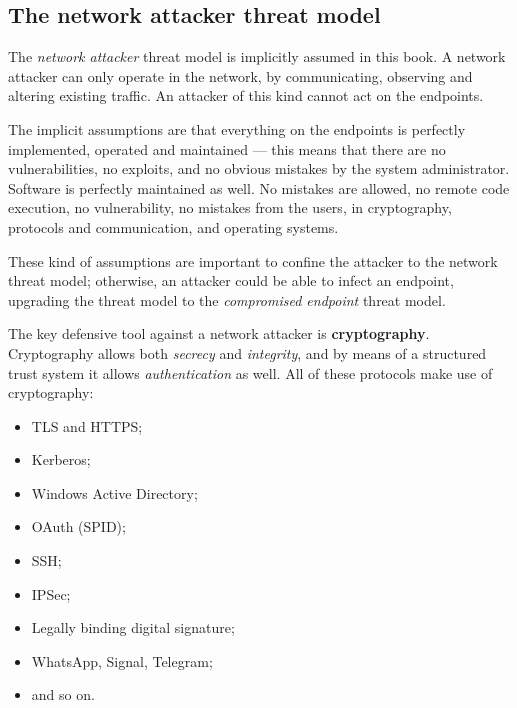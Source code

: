 \documentclass[10pt]{extreport}
\begin{document}
\subsection{The network attacker threat model}

The \emph{network attacker} threat model is implicitly assumed in this book. A
network attacker can only operate in the network, by communicating, observing
and altering existing traffic. An attacker of this kind cannot act on the
endpoints.

The implicit assumptions are that everything on the endpoints is perfectly
implemented, operated and maintained --- this means that there are no
vulnerabilities, no exploits, and no obvious mistakes by the system
administrator. Software is perfectly maintained as well. No mistakes are
allowed, no remote code execution, no vulnerability, no mistakes from the
users, in cryptography, protocols and communication, and operating systems.

These kind of assumptions are important to confine the attacker to the network
threat model; otherwise, an attacker could be able to infect an endpoint,
upgrading the threat model to the \emph{compromised endpoint} threat
model.

The key defensive tool against a network attacker is \textbf{cryptography}.
Cryptography allows both \emph{secrecy} and \emph{integrity}, and by means of a
structured trust system it allows \emph{authentication} as well. All of these
protocols make use of cryptography:
\begin{itemize}
    \item TLS and HTTPS;
    \item Kerberos;
    \item Windows Active Directory;
    \item OAuth (SPID);
    \item SSH;
    \item IPSec;
    \item Legally binding digital signature;
    \item WhatsApp, Signal, Telegram;
    \item and so on.
\end{itemize}
\end{document}

